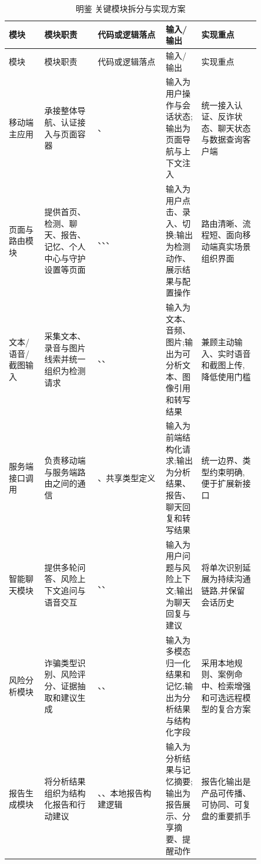 \documentclass[UTF8,a4paper,12pt]{ctexart}
\newcommand{\codepath}[1]{\seqsplit{#1}}
\begin{document}
\renewcommand{\arraystretch}{1.3}
{\footnotesize
\begin{longtable}{p{0.12\linewidth}p{0.18\linewidth}p{0.23\linewidth}p{0.12\linewidth}p{0.20\linewidth}}
    \caption{明鉴 关键模块拆分与实现方案} \label{tab:module-implementation} \\
    \toprule
    模块 & 模块职责 & 代码或逻辑落点 & 输入/输出 & 实现重点 \\
    \midrule
    \endfirsthead
    \toprule
    模块 & 模块职责 & 代码或逻辑落点 & 输入/输出 & 实现重点 \\
    \midrule
    \endhead
    移动端主应用 & 承接整体导航、认证接入与页面容器 & \codepath{app/\_layout.tsx}、\codepath{app/(tabs)/\_layout.tsx} & 输入为用户操作与会话状态;输出为页面导航与上下文注入 & 统一接入认证、反诈状态、聊天状态与数据查询客户端 \\
    页面与路由模块 & 提供首页、检测、聊天、报告、记忆、个人中心与守护设置等页面 & \codepath{app/(tabs)/*}、\codepath{app/login.tsx}、\codepath{app/onboarding.tsx}、\codepath{app/guardian-settings.tsx} & 输入为用户点击、录入、切换;输出为检测动作、展示结果与配置操作 & 路由清晰、流程短、面向移动端真实场景组织界面 \\
    文本/语音/截图输入 & 采集文本、录音与图片线索并统一组织为检测请求 & \codepath{app/(tabs)/detect.tsx}、\codepath{components/voice-chat-modal.tsx}、\codepath{lib/use-voice-chat.ts} & 输入为文本、音频、图片;输出为可分析文本、图像引用和转写结果 & 兼顾主动输入、实时语音和截图上传,降低使用门槛 \\
    服务端接口调用 & 负责移动端与服务端路由之间的通信 & \codepath{lib/trpc.ts}、共享类型定义 & 输入为前端结构化请求;输出为分析结果、报告、聊天回复和转写结果 & 统一边界、类型约束明确,便于扩展新接口 \\
    智能聊天模块 & 提供多轮问答、风险上下文追问与语音交互 & \codepath{app/(tabs)/chat.tsx}、\codepath{lib/chat-store.tsx}、\codepath{server/chat-router.ts} & 输入为用户问题与风险上下文;输出为聊天回复与建议 & 将单次识别延展为持续沟通链路,并保留会话历史 \\
    风险分析模块 & 诈骗类型识别、风险评分、证据抽取和建议生成 & \codepath{lib/anti-fraud-engine.ts}、\codepath{server/anti-fraud-router.ts}、\codepath{shared/anti-fraud.ts} & 输入为多模态归一化结果和记忆;输出为分析结果与结构化字段 & 采用本地规则、案例命中、检索增强和可选远程模型的复合方案 \\
    报告生成模块 & 将分析结果组织为结构化报告和行动建议 & \codepath{app/(tabs)/report.tsx}、\codepath{server/anti-fraud-router.ts}、本地报告构建逻辑 & 输入为分析结果与记忆摘要;输出为报告展示、分享摘要、提醒动作 & 报告化输出是产品可传播、可协同、可复盘的重要抓手 \\

\end{longtable}}
\end{document}
